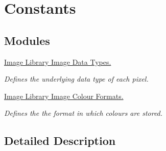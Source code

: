 \hypertarget{group__consts}{\section{Constants}
\label{group__consts}
}
\subsection*{Modules}
\begin{DoxyCompactItemize}
\item 
\hyperlink{group__il__data__types}{Image Library Image Data Types.}
\begin{DoxyCompactList}\small\item\em Defines the underlying data type of each pixel. \end{DoxyCompactList}\item 
\hyperlink{group__il__data__formats}{Image Library Image Colour Formats.}
\begin{DoxyCompactList}\small\item\em Defines the the format in which colours are stored. \end{DoxyCompactList}\end{DoxyCompactItemize}


\subsection{Detailed Description}
